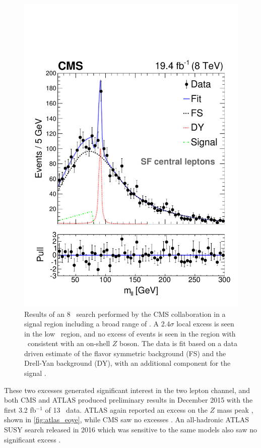 \begin{centering}
\begin{figure}[!hbt]
\myfloatalign
\includegraphics[width=.9\linewidth]{figures/theory/H1_FIT_SF_CE.pdf}
\caption{ Results of an 8 \tev~search performed by the \ac{CMS} collaboration in a signal region including a broad range of \mll. A 2.4$\sigma$ local excess is seen in the low \mll~region, and no excess of events is seen in the region with \mll~consistent with an on-shell $Z$ boson. The data is fit based on a data driven estimate of the flavor symmetric background (FS) and the Drell-Yan background (DY), with an additional component for the signal \cite{CMS2}.}
\label{fig:cms_8tev}
\end{figure}
\end{centering}

These two excesses generated significant interest in the two lepton channel, and both \ac{CMS} and \ac{ATLAS} produced preliminary results in December 2015 with the first 3.2 fb$^{-1}$ of 13 \tev~data. \ac{ATLAS} again reported an excess on the $Z$ mass peak \cite{ATLAS-CONF-2015-082}, shown in \autoref{fig:atlas_eoye}, while \ac{CMS} saw no excesses \cite{CMS-PAS-SUS-15-011}. An all-hadronic \ac{ATLAS} \ac{SUSY} search released in 2016 which was sensitive to the same models also saw no significant excess \cite{ATLAS:2016kts}.

